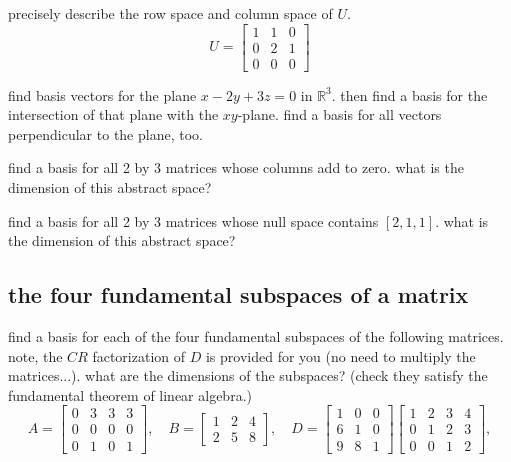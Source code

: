\documentclass[addpoints]{exam}
\begin{document}
\begin{questions}
\begin{parts}
	\part $[2, 0, 0, 4]$, $[3, 6, 0, 6]$, $[4, 7, 0,8]$, $[1, 0, 9, 2]$
\end{parts}

\question precisely describe the row space and column space of $U$.
\begin{equation*}
      U=  \begin{bmatrix} 1&1&0\\ 0&2&1 \\0&0&0\end{bmatrix}
\end{equation*}

\question find basis vectors for the plane $x-2y+3z=0$ in $\mathbb{R}^3$. then find a basis for the intersection of that plane with the $xy$-plane. find a basis for all vectors perpendicular to the plane, too.

\question find a basis for all 2 by 3 matrices whose columns add to zero. what is the dimension of this abstract space?

\question find a basis for all 2 by 3 matrices whose null space contains $[2, 1, 1]$. what is the dimension of this abstract space?

\subsection*{the four fundamental subspaces of a matrix}
\question find a basis for each of the four fundamental subspaces of the following matrices. note, the $CR$ factorization of $D$ is provided for you (no need to multiply the matrices...). what are the dimensions of the subspaces? (check they satisfy the fundamental theorem of linear algebra.)
\begin{equation*}
      A = \begin{bmatrix} 0&3&3&3 \\ 0&0&0&0\\ 0&1&0&1 \end{bmatrix},  \quad B=\begin{bmatrix} 1&2&4 \\ 2&5&8 \end{bmatrix},\quad D = \begin{bmatrix} 1&0&0 \\ 6&1&0\\ 9&8&1 \end{bmatrix}\begin{bmatrix} 1&2&3&4 \\ 0&1&2&3\\ 0&0&1&2 \end{bmatrix},
\end{equation*}


\end{questions}
\end{document}
